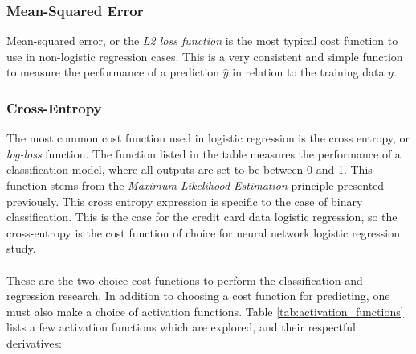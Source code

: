         \subsubsection{Mean-Squared Error}
            Mean-squared error, or the \textit{L2 loss function} is the most typical cost function to use in non-logistic regression cases. This is a very consistent and simple function to measure the performance of a prediction $\hat{y}$ in relation to the training data $y$.
        \subsubsection{Cross-Entropy}
            The most common cost function used in logistic regression is the cross entropy, or \textit{log-loss} function. The function listed in the table measures the performance of a classification model, where all outputs are set to be between 0 and 1. This function stems from the \textit{Maximum Likelihood Estimation} principle presented previously.
            This cross entropy expression is specific to the case of binary classification. %
            This is the case for the credit card data logistic regression,
            so the cross-entropy is the cost function of choice for neural network logistic regression study. \\\\
	        These are the two choice cost functions to perform the classification and regression research. In addition to choosing a cost function for predicting, one must also make a choice of activation functions. Table \ref{tab:activation_functions} lists a few activation functions which are explored, and their respectful derivatives:
